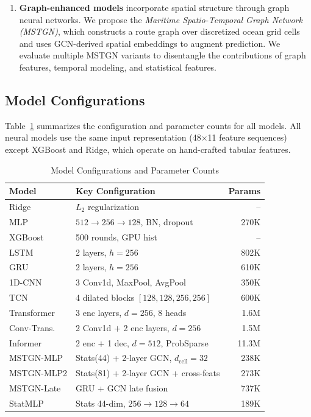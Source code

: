 \documentclass[conference]{IEEEtran}
\begin{document}
\begin{enumerate}
    \item \textbf{Graph-enhanced models} incorporate spatial structure through graph neural networks. We propose the \textit{Maritime Spatio-Temporal Graph Network (MSTGN)}, which constructs a route graph over discretized ocean grid cells and uses GCN-derived spatial embeddings to augment prediction. We evaluate multiple MSTGN variants to disentangle the contributions of graph features, temporal modeling, and statistical features.
\end{enumerate}

\subsection{Model Configurations}

Table~\ref{tab:model_configs} summarizes the configuration and parameter counts for all models.
All neural models use the same input representation (48$\times$11 feature sequences) except XGBoost and Ridge, which operate on hand-crafted tabular features.

\begin{table}[t]
    \centering
    \caption{Model Configurations and Parameter Counts}
    \label{tab:model_configs}
    \begin{tabular}{llr}
        \toprule
        \textbf{Model} & \textbf{Key Configuration} & \textbf{Params} \\
        \midrule
        Ridge & $L_2$ regularization & -- \\
        MLP & $512{\to}256{\to}128$, BN, dropout & 270K \\
        XGBoost & 500 rounds, GPU hist & -- \\
        \midrule
        LSTM & 2 layers, $h{=}256$ & 802K \\
        GRU & 2 layers, $h{=}256$ & 610K \\
        \midrule
        1D-CNN & 3 Conv1d, MaxPool, AvgPool & 350K \\
        TCN & 4 dilated blocks $[128,128,256,256]$ & 600K \\
        \midrule
        Transformer & 3 enc layers, $d{=}256$, 8 heads & 1.6M \\
        Conv-Trans. & 2 Conv1d $+$ 2 enc layers, $d{=}256$ & 1.5M \\
        Informer & 2 enc $+$ 1 dec, $d{=}512$, ProbSparse & 11.3M \\
        \midrule
        MSTGN-MLP & Stats(44) + 2-layer GCN, $d_\text{cell}{=}32$ & 238K \\
        MSTGN-MLP2 & Stats(81) + 2-layer GCN + cross-feats & 273K \\
        MSTGN-Late & GRU + GCN late fusion & 737K \\
        StatMLP & Stats 44-dim, $256{\to}128{\to}64$ & 189K \\
        \bottomrule
    \end{tabular}
\end{table}
\end{document}
